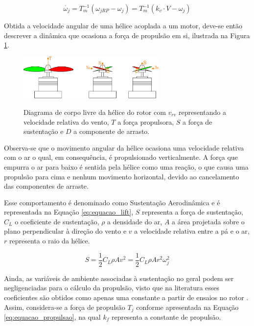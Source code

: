 \documentclass[main.tex]{subfiles}
\begin{document}
\begin{equation}\label{eq:sinal_eletrico_rotor}
	\dot{\omega_j} = T_m^{-1}(\omega_{jRP} - \omega_j) = T_m^{-1}(k_v \cdot V - \omega_j)
\end{equation}

Obtida a velocidade angular de uma hélice acoplada a um motor, deve-se então descrever a dinâmica que ocasiona a força de propulsão em si, ilustrada na Figura \ref{fig:lift_forces}.


\begin{figure}[!h]
	\centering
	\caption{Diagrama de corpo livre da hélice do rotor com $v_{rv}$ representando a velocidade relativa do vento, $T$ a força propulsora, $S$ a força de sustentação e $D$ a componente de arrasto.}
	\includegraphics[width=0.65\textwidth]{capitulos/modelagem/imgs/lift_forces.png}
	\label{fig:lift_forces}
\end{figure}

Observa-se que o movimento angular da hélice ocasiona uma velocidade relativa com o ar o qual, em consequência, é propulsionado verticalmente. A força que empurra o ar para baixo é sentida pela hélice como uma reação, o que causa uma propulsão para cima e nenhum movimento horizontal, devido ao cancelamento das componentes de arraste. 

Esse comportamento é denominado como Sustentação Aerodinâmica \cite{fundamentals_aerodynamics} e é representada na Equação \ref{eq:equacao_lift}, $S$ representa a força de sustentação, $C_L$ o coeficiente de sustentação, $\rho$ a densidade do ar, $A$ a área projetada sobre o plano perpendicular à direção do vento e $v$ a velocidade relativa entre a pá e o ar, $r$ representa o raio da hélice.

\begin{equation}\label{eq:equacao_lift}
	S = \frac{1}{2}C_L\rho A v^2 = \frac{1}{2}C_L\rho A r^2 \omega_j^2
\end{equation}

Ainda, as variáveis de ambiente associadas à sustentação no geral podem ser negligenciadas para o cálculo da propulsão, visto que na literatura esses coeficientes são obtidos como apenas uma constante a partir de ensaios no rotor \cite{muzar2016experimental}. Assim, considera-se a força de propulsão $T_j$ conforme apresentada na Equação \ref{eq:equacao_propulsao}, na qual $k_f$ representa a constante de propulsão.
\end{document}
